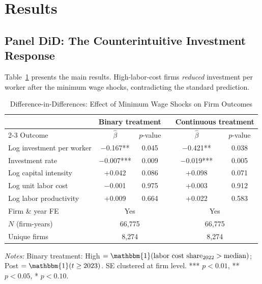 \documentclass[a4paper,fleqn]{cas-sc}
\begin{document}
\section{Results}
\label{sec:results}

\subsection{Panel DiD: The Counterintuitive Investment Response}
\label{subsec:results_did}

Table~\ref{tab:did_main} presents the main results. High-labor-cost firms \emph{reduced} investment per worker after the minimum wage shocks, contradicting the standard prediction.

\begin{table}[htbp]
\centering
\begin{threeparttable}
\caption{Difference-in-Differences: Effect of Minimum Wage Shocks on Firm Outcomes}
\label{tab:did_main}
\begin{tabular}{lccccc}
\toprule
& \multicolumn{2}{c}{Binary treatment} & & \multicolumn{2}{c}{Continuous treatment} \\
\cmidrule{2-3} \cmidrule{5-6}
Outcome & $\hat{\beta}$ & $p$-value & & $\hat{\beta}$ & $p$-value \\
\midrule
Log investment per worker & $-$0.167** & 0.045 & & $-$0.421** & 0.038 \\
Investment rate & $-$0.007*** & 0.009 & & $-$0.019*** & 0.005 \\
Log capital intensity & +0.042 & 0.086 & & +0.098 & 0.071 \\
Log unit labor cost & $-$0.001 & 0.975 & & +0.003 & 0.912 \\
Log labor productivity & +0.009 & 0.664 & & +0.022 & 0.583 \\
\midrule
Firm \& year FE & \multicolumn{2}{c}{Yes} & & \multicolumn{2}{c}{Yes} \\
$N$ (firm-years) & \multicolumn{2}{c}{66,775} & & \multicolumn{2}{c}{66,775} \\
Unique firms & \multicolumn{2}{c}{8,274} & & \multicolumn{2}{c}{8,274} \\
\bottomrule
\end{tabular}
\begin{tablenotes}
\small
\item \textit{Notes:} Binary treatment: High $= \mathbbm{1}(\text{labor cost share}_{2022} > \text{median})$; Post $= \mathbbm{1}(t \geq 2023)$. SE clustered at firm level. *** $p<0.01$, ** $p<0.05$, * $p<0.10$.
\end{tablenotes}
\end{threeparttable}
\end{table}
\end{document}
